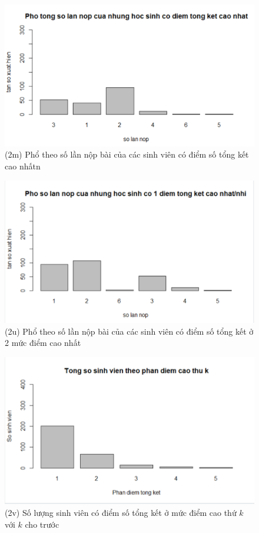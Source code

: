 \documentclass[a4paper]{article}
\theoremstyle{definition}
\begin{document}
\begin{figure}[!ht]
    \centering
    \includegraphics[scale=0.4]{Pics/q2m-file3.PNG}
    \caption{(2m) Phổ theo số lần nộp bài của các sinh viên có điểm số tổng kết cao nhấtn}
    \label{fig:my_label}
\end{figure}
\begin{figure}[!ht]
    \centering
    \includegraphics[scale=0.4]{Pics/q2u-file3.PNG}
    \caption{(2u) Phổ theo số lần nộp bài của các sinh viên có điểm số tổng kết ở 2 mức điểm cao nhất}
    \label{fig:my_label}
\end{figure}
\newpage 
\begin{figure}[!ht]
    \centering
    \includegraphics[scale=0.4]{Pics/q2v-file3.PNG}
    \caption{(2v) Số lượng sinh viên có điểm số tổng kết ở mức điểm cao thứ $k$ với $k$ cho trước}
    \label{fig:my_label}
\end{figure}
\end{document}

